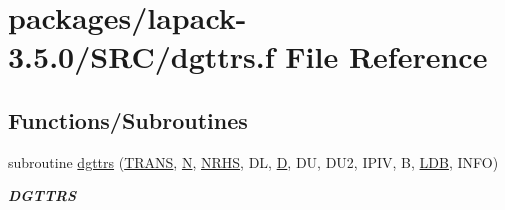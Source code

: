 \hypertarget{dgttrs_8f}{}\section{packages/lapack-\/3.5.0/\+S\+R\+C/dgttrs.f File Reference}
\label{dgttrs_8f}
\subsection*{Functions/\+Subroutines}
\begin{DoxyCompactItemize}
\item 
subroutine \hyperlink{group__doubleGTcomputational_ga887f9fe1a0c6a4aeac1752da5652014a}{dgttrs} (\hyperlink{superlu__enum__consts_8h_a0c4e17b2d5cea33f9991ccc6a6678d62a1f61e3015bfe0f0c2c3fda4c5a0cdf58}{T\+R\+A\+N\+S}, \hyperlink{polmisc_8c_a0240ac851181b84ac374872dc5434ee4}{N}, \hyperlink{example__user_8c_aa0138da002ce2a90360df2f521eb3198}{N\+R\+H\+S}, D\+L, \hyperlink{odrpack_8h_a7dae6ea403d00f3687f24a874e67d139}{D}, D\+U, D\+U2, I\+P\+I\+V, B, \hyperlink{example__user_8c_a50e90a7104df172b5a89a06c47fcca04}{L\+D\+B}, I\+N\+F\+O)
\begin{DoxyCompactList}\small\item\em {\bfseries D\+G\+T\+T\+R\+S} \end{DoxyCompactList}\end{DoxyCompactItemize}
